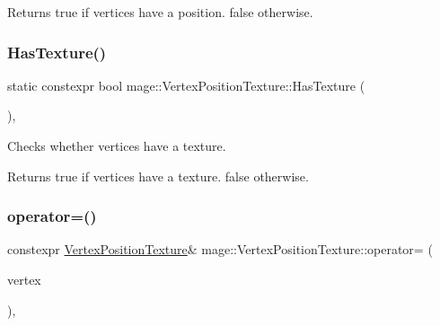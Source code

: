 \begin{DoxyReturn}{Returns}
{\ttfamily true} if vertices have a position. {\ttfamily false} otherwise. 
\end{DoxyReturn}
\hypertarget{structmage_1_1_vertex_position_texture_a8812d80a2f933fdbea33cfd356245c2d}{}\label{structmage_1_1_vertex_position_texture_a8812d80a2f933fdbea33cfd356245c2d} 
\subsubsection{\texorpdfstring{Has\+Texture()}{HasTexture()}}
{\footnotesize\ttfamily static constexpr bool mage\+::\+Vertex\+Position\+Texture\+::\+Has\+Texture (\begin{DoxyParamCaption}{ }\end{DoxyParamCaption})\hspace{0.3cm}{\ttfamily [static]}, {\ttfamily [noexcept]}}

Checks whether vertices have a texture.

\begin{DoxyReturn}{Returns}
{\ttfamily true} if vertices have a texture. {\ttfamily false} otherwise. 
\end{DoxyReturn}
\hypertarget{structmage_1_1_vertex_position_texture_ad58b6157a9ec702b42a56037db1d41d3}{}\label{structmage_1_1_vertex_position_texture_ad58b6157a9ec702b42a56037db1d41d3} 
\subsubsection{\texorpdfstring{operator=()}{operator=()}\hspace{0.1cm}{\footnotesize\ttfamily [1/2]}}
{\footnotesize\ttfamily constexpr \hyperlink{structmage_1_1_vertex_position_texture}{Vertex\+Position\+Texture}\& mage\+::\+Vertex\+Position\+Texture\+::operator= (\begin{DoxyParamCaption}\item[{const \hyperlink{structmage_1_1_vertex_position_texture}{Vertex\+Position\+Texture} \&}]{vertex }\end{DoxyParamCaption})\hspace{0.3cm}{\ttfamily [default]}, {\ttfamily [noexcept]}}

